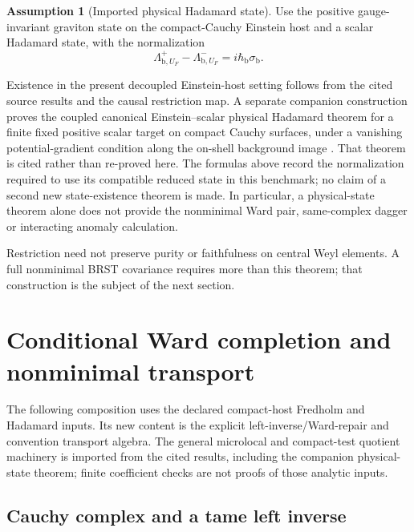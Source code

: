 \documentclass[11pt]{article}
\theoremstyle{definition}
\newtheorem{assumption}[theorem]{Assumption}
\theoremstyle{remark}
\newcommand{\U}{U_{F}}
\newcommand{\hbarLB}{\hbar_{\mathrm{b}}}
\begin{document}
\begin{assumption}[Imported physical Hadamard state]
Use the positive gauge-invariant graviton state on the compact-Cauchy Einstein
host and a scalar Hadamard state, with the normalization
\begin{equation}
\Lambda_{\mathrm{b},\U}^+-\Lambda_{\mathrm{b},\U}^-
=i\hbarLB\sigma_{\mathrm{b}}.
\label{eq:reducedcomm}
\end{equation}
\end{assumption}
Existence in the present decoupled Einstein-host setting follows from the cited
source results and the causal restriction map. A separate companion construction
proves the coupled canonical Einstein--scalar physical Hadamard theorem for a
finite fixed positive scalar target on compact Cauchy surfaces, under a vanishing
potential-gradient condition along the on-shell background image
\cite{CanonicalPhysical2026}. That theorem is cited rather than re-proved here.
The formulas above record the normalization required to use its compatible
reduced state in this benchmark; no claim of a second new state-existence theorem
is made. In particular, a physical-state theorem alone does not provide the
nonminimal Ward pair, same-complex dagger or interacting anomaly calculation.

Restriction need not preserve purity or faithfulness on central Weyl elements.  A
full nonminimal BRST covariance requires more than this theorem; that construction is
the subject of the next section.

\section{Conditional Ward completion and nonminimal transport}
The following composition uses the declared compact-host Fredholm and Hadamard
inputs. Its new content is the explicit left-inverse/Ward-repair and convention
transport algebra. The general microlocal and compact-test quotient machinery is
imported from the cited results, including the companion physical-state theorem;
finite coefficient checks are not proofs of those analytic inputs.


\subsection{Cauchy complex and a tame left inverse}
\end{document}
